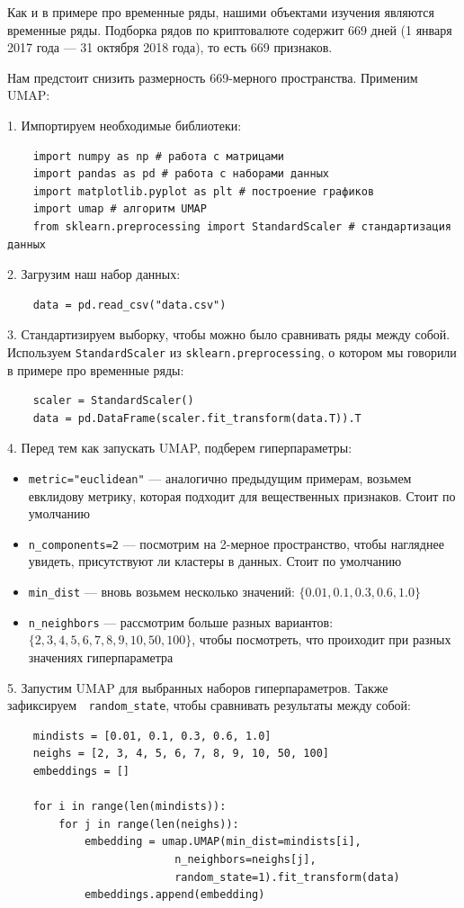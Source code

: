 \graphicspath{{main/}}
Как и в примере про временные ряды, нашими объектами изучения являются временные ряды. Подборка рядов по криптовалюте содержит 669 дней (1 января 2017 года --- 31 октября 2018 года), то есть 669 признаков.

Нам предстоит снизить размерность 669-мерного пространства. Применим UMAP:

1. Импортируем необходимые библиотеки:

\begin{verbatim}
	import numpy as np # работа с матрицами
	import pandas as pd # работа с наборами данных
	import matplotlib.pyplot as plt # построение графиков
	import umap # алгоритм UMAP
	from sklearn.preprocessing import StandardScaler # стандартизация данных
\end{verbatim}

2. Загрузим наш набор данных:
\begin{verbatim}
	data = pd.read_csv("data.csv")
\end{verbatim}

3. Стандартизируем выборку, чтобы можно было сравнивать ряды между собой. Используем \verb|StandardScaler| из \verb|sklearn.preprocessing|, о котором мы говорили в примере про временные ряды:
\begin{verbatim}
	scaler = StandardScaler()
	data = pd.DataFrame(scaler.fit_transform(data.T)).T
\end{verbatim}

4. Перед тем как запускать UMAP, подберем гиперпараметры:
\begin{itemize}
	\item \verb|metric="euclidean"| --- аналогично предыдущим примерам, возьмем евклидову метрику, которая подходит для вещественных признаков. Стоит по умолчанию
	\item \verb|n_components=2| --- посмотрим на 2-мерное пространство, чтобы нагляднее увидеть, присутствуют ли кластеры в данных. Стоит по умолчанию
	\item \verb|min_dist| --- вновь возьмем несколько значений: $\{0.01, 0.1, 0.3, 0.6, 1.0\}$
	\item \verb|n_neighbors| --- рассмотрим больше разных вариантов: $\{2, 3, 4, 5, 6, 7, 8, 9, 10, 50, 100\}$, чтобы посмотреть, что проиходит при разных значениях гиперпараметра
\end{itemize}

5. Запустим UMAP для выбранных наборов гиперпараметров. Также зафиксируем $\;$ \verb|random_state|, чтобы сравнивать результаты между собой:
\begin{verbatim}
	mindists = [0.01, 0.1, 0.3, 0.6, 1.0]
	neighs = [2, 3, 4, 5, 6, 7, 8, 9, 10, 50, 100]
	embeddings = []
	
	for i in range(len(mindists)):
		for j in range(len(neighs)):
			embedding = umap.UMAP(min_dist=mindists[i],
					      n_neighbors=neighs[j],
					      random_state=1).fit_transform(data)
			embeddings.append(embedding)
\end{verbatim}

